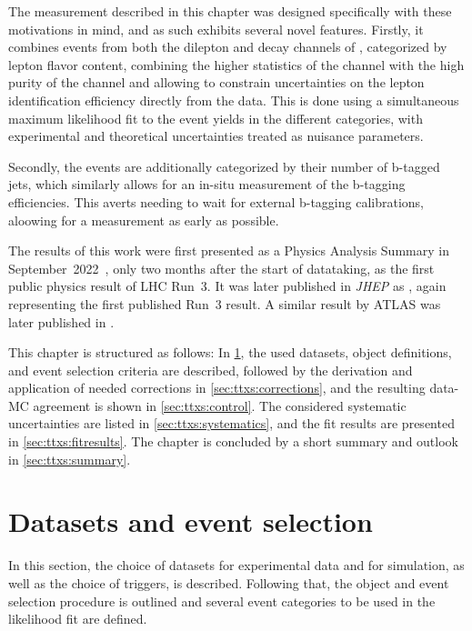 The measurement described in this chapter was designed specifically with these motivations in mind, and as such exhibits several novel features. Firstly, it combines events from both the dilepton and \ljets decay channels of \ttbar, categorized by lepton flavor content, combining the higher statistics of the \ljets channel with the high purity of the \emu channel and allowing to constrain uncertainties on the lepton identification efficiency directly from the data. This is done using a simultaneous maximum likelihood fit to the event yields in the different categories, with experimental and theoretical uncertainties treated as nuisance parameters.

Secondly, the events are additionally categorized by their number of b-tagged jets, which similarly allows for an in-situ measurement of the b-tagging efficiencies. This averts needing to wait for external b-tagging calibrations, aloowing for a measurement as early as possible.

The results of this work were first presented as a Physics Analysis Summary in September~2022~\cite{CMS:TOP-22-012-PAS}, only two months after the start of datataking, as the first public physics result of LHC Run~3. It was later published in \textit{JHEP} as , again representing the first published Run~3 result. A similar result by ATLAS was later published in .

This chapter is structured as follows: In \cref{sec:ttxs:setup}, the used datasets, object definitions, and event selection criteria are described, followed by the derivation and application of needed corrections in \cref{sec:ttxs:corrections}, and the resulting data-MC agreement is shown in \cref{sec:ttxs:control}. The considered systematic uncertainties are listed in \cref{sec:ttxs:systematics}, and the fit results are presented in \cref{sec:ttxs:fitresults}. The chapter is concluded by a short summary and outlook in \cref{sec:ttxs:summary}.

\section{Datasets and event selection}
\label{sec:ttxs:setup}

In this section, the choice of datasets for experimental data and for simulation, as well as the choice of triggers, is described. Following that, the object and event selection procedure is outlined and several event categories to be used in the likelihood fit are defined. 

